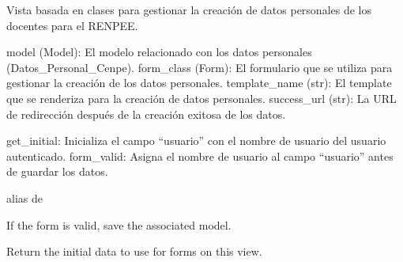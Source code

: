 \documentclass[letterpaper,10pt,spanish]{sphinxmanual}
\begin{document}
\begin{fulllineitems}

\pysigstartsignatures
{}
\pysigstopsignatures
\sphinxAtStartPar
Vista basada en clases para gestionar la creación de datos personales de los docentes para el RENPEE.
\begin{description}
\sphinxAtStartPar
model (Model): El modelo relacionado con los datos personales (Datos\_Personal\_Cenpe).
form\_class (Form): El formulario que se utiliza para gestionar la creación de los datos personales.
template\_name (str): El template que se renderiza para la creación de datos personales.
success\_url (str): La URL de redirección después de la creación exitosa de los datos.

\sphinxAtStartPar
get\_initial: Inicializa el campo “usuario” con el nombre de usuario del usuario autenticado.
form\_valid: Asigna el nombre de usuario al campo “usuario” antes de guardar los datos.

\end{description}


\begin{fulllineitems}

\pysigstartsignatures
{}
\pysigstopsignatures
\sphinxAtStartPar
alias de 

\end{fulllineitems}



\begin{fulllineitems}

\pysigstartsignatures
{}
\pysigstopsignatures
\sphinxAtStartPar
If the form is valid, save the associated model.

\end{fulllineitems}



\begin{fulllineitems}

\pysigstartsignatures
{}
\pysigstopsignatures
\sphinxAtStartPar
Return the initial data to use for forms on this view.


\end{fulllineitems}
\end{fulllineitems}
\end{document}
